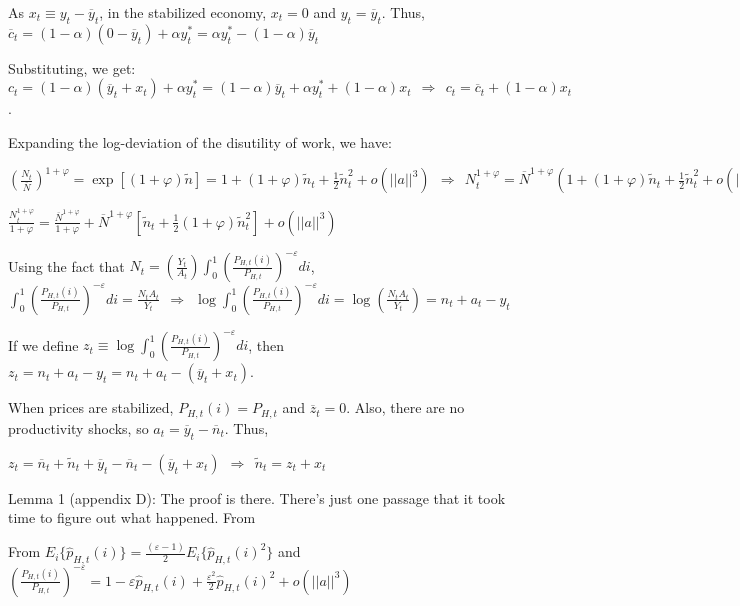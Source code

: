 \documentclass[
]{article}
\begin{document}
As \(x_t \equiv y_t-\overline{y}_t\), in the stabilized economy,
\(x_t=0\) and \(y_t=\overline{y}_t\). Thus,
\(\overline{c}_t = (1-\alpha)(0-\overline{y}_t)+\alpha y_t^*=\alpha y_t^*-(1-\alpha)\overline {y}_t\)

Substituting, we get:
\(c_t = (1-\alpha)(\overline{y}_t+x_t)+\alpha y_t^*=(1-\alpha)\overline{y}_t+\alpha y_t^* +(1-\alpha)x_t \ \ \Rightarrow \ \ c_t=\overline{c}_t+(1-\alpha)x_t\).

Expanding the log-deviation of the disutility of work, we have:

\(\displaystyle \left( \frac{N_t}{\overline{N} } \right)^{1+\varphi}=\exp[(1+\varphi)\widetilde{n}]=1+(1+\varphi)\widetilde{n}_t + \frac{1}{2}\widetilde{n}_t^2 + o(||a||^3) \ \ \Rightarrow \ \ N_t^{1+\varphi} = \overline{N}^{1+\varphi} \left( 1+(1+\varphi)\widetilde{n}_t + \frac{1}{2}\widetilde{n}_t^2 + o(||b||^3) \right)\)

\(\displaystyle \frac{N_t^{1+\varphi}}{1+\varphi} = \frac{\overline{N}^{1+\varphi}}{1+\varphi} +\overline{N}^{1+\varphi}\left[ \widetilde{n}_t + \frac{1}{2}(1+\varphi)\widetilde{n}_t^2 \right] + o(||a||^3)\)

Using the fact that
\(\displaystyle N_t=\left(\frac{Y_t}{A_t} \right) \int_0^1 \left(\frac{P_{H,t}(i)}{P_{H,t}} \right)^{-\varepsilon}di\),
\(\displaystyle \int_0^1 \left(\frac{P_{H,t}(i)}{P_{H,t}} \right)^{-\varepsilon}di=\frac{N_t A_t}{Y_t} \ \ \Rightarrow \ \ \log \int_0^1 \left(\frac{P_{H,t}(i)}{P_{H,t}} \right)^{-\varepsilon}di= \log \left( \frac{N_t A_t}{Y_t} \right)=n_t+a_t-y_t\)

If we define
\(\displaystyle z_t \equiv \log \int_0^1 \left(\frac{P_{H,t}(i)}{P_{H,t}} \right)^{-\varepsilon}di\),
then \(z_t=n_t+a_t-y_t=n_t+a_t-(\overline{y}_t+x_t)\).

When prices are stabilized, \(P_{H,t}(i)=P_{H,t}\) and
\(\overline{z}_t=0\). Also, there are no productivity shocks, so
\(a_t= \overline{y}_t-\overline{n}_t\). Thus,

\(z_t=\overline{n}_t+\widetilde{n}_t+\overline{y}_t-\overline{n}_t-(\overline{y}_t+x_t) \ \ \Rightarrow \ \ \widetilde{n}_t=z_t+x_t\)

Lemma 1 (appendix D): The proof is there. There's just one passage that
it took time to figure out what happened. From

From
\(\displaystyle E_i \{ \widehat{p}_{H,t}(i)\} = \frac{(\varepsilon-1)}{2}E_i \{ \widehat{p}_{H,t}(i)^2\}\)
and
\(\displaystyle \left(\frac{P_{H,t}(i)}{P_{H,t}} \right)^{-\varepsilon}=1-\varepsilon \widehat{p}_{H,t}(i)+ \frac{\varepsilon^2}{2} \widehat{p}_{H,t}(i)^2+o(||a||^3)\)
\end{document}
